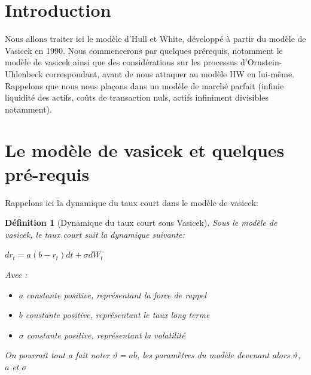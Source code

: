 \documentclass[11pt]{article}
\newtheorem{definition}[theorem]{Définition}
\let\vega\vartheta
\begin{document}


\begin{abstract}
Après avoir rappelé la dynamique du taux court, sa solution dans le modèle Vasicek, ainsi quelques considérations à propos des processus d'Ornstein-Uhlenbeck, nous nous interessons au modèle à un facteur : le modèle de Hull et White. Nous en rappelons la dynamique de taux court, calculons la forme explicite de du taux court en en résolvant l'équation différentielle stochastique, calculons ensuite le prix du zero coupon ainsi que les taux d'interet continu moyen.Finalement, nous traçons la surface de taux correspondante en prenant des paramètres arbitraires. 
\end{abstract}

\tableofcontents

\section{Introduction}
Nous allons traiter ici le modèle d'Hull et White, développé à partir du modèle de Vasicek en 1990. Nous commencerons par quelques prérequis, notamment le modèle de vasicek ainsi que des considérations sur les processus d'Ornstein-Uhlenbeck correspondant, avant de nous attaquer au modèle HW en lui-même. Rappelons que nous nous plaçons dans un modèle de marché parfait (infinie liquidité des actifs, coûts de transaction nuls, actifs infiniment divisibles notamment).

\section{Le modèle de vasicek et quelques pré-requis}


Rappelons ici la dynamique du taux court dans le modèle de vasicek: 

\begin{definition}[Dynamique du taux court sous Vasicek]
Sous le modèle de vasicek, le taux court suit la dynamique suivante: 
\begin{center}
$dr_{t} = a(b-r_{t})dt + \sigma dW_{t}$
\end{center}
Avec :
\begin{itemize}
  \item $a$ constante positive, représentant la force de rappel
  \item $b$ constante positive, représentant le taux long terme
  \item $\sigma$ constante positive, représentant la volatilité
\end{itemize}
On pourrait tout a fait noter $\vega = ab$, les paramètres du modèle devenant alors $\vega$, $a$ et $\sigma$
\end{definition}
\end{document}
